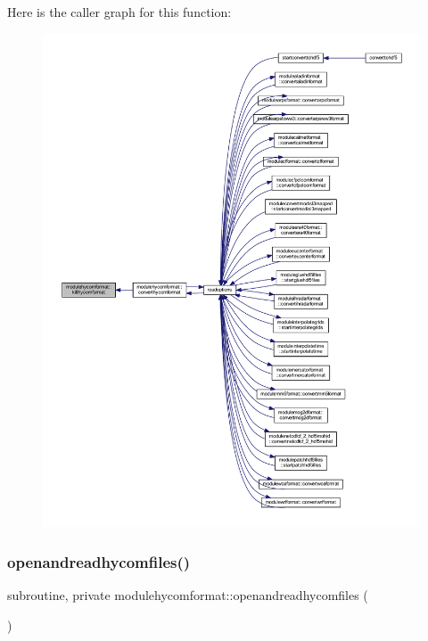 Here is the caller graph for this function\+:\nopagebreak
\begin{figure}[H]
\begin{center}
\leavevmode
\includegraphics[width=350pt]{namespacemodulehycomformat_aa2e49450c9d2acce5c240fae7e58eb05_icgraph}
\end{center}
\end{figure}
\mbox{\label{namespacemodulehycomformat_acba9e941ba6903be2a19cdc9e036cd64}} 
\subsubsection{\texorpdfstring{openandreadhycomfiles()}{openandreadhycomfiles()}}
{\footnotesize\ttfamily subroutine, private modulehycomformat\+::openandreadhycomfiles (\begin{DoxyParamCaption}{ }\end{DoxyParamCaption})\hspace{0.3cm}{\ttfamily [private]}}

